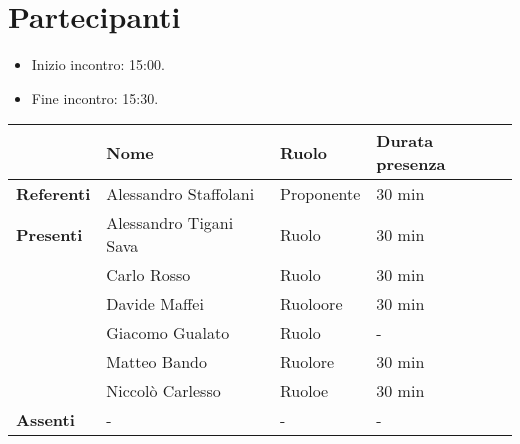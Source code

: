 \section*{Partecipanti}

\begin{itemize}
	\item Inizio incontro: 15:00.
	\item Fine incontro: 15:30.
\end{itemize}


\begin{center}
	{\renewcommand{\arraystretch}{1.5}
		\begin{tabular}{l|lll}
			                   & \textbf{Nome}          & \textbf{Ruolo} & \textbf{Durata presenza} \\
			\hline
			\textbf{Referenti} & Alessandro Staffolani  & Proponente     & 30 min                   \\
			\hline
			\textbf{Presenti}  & Alessandro Tigani Sava & Ruolo          & 30 min                   \\
			                   & Carlo Rosso            & Ruolo          & 30 min                   \\
			                   & Davide Maffei          & Ruoloore       & 30 min                   \\
			& Giacomo Gualato        & Ruolo          & -                        \\
			                   & Matteo Bando           & Ruolore        & 30 min                   \\
			                   & Niccolò Carlesso       & Ruoloe         & 30 min                   \\
			\hline
			\textbf{Assenti}   & -                      & -              & -                        \\
		\end{tabular}
	}
\end{center}
